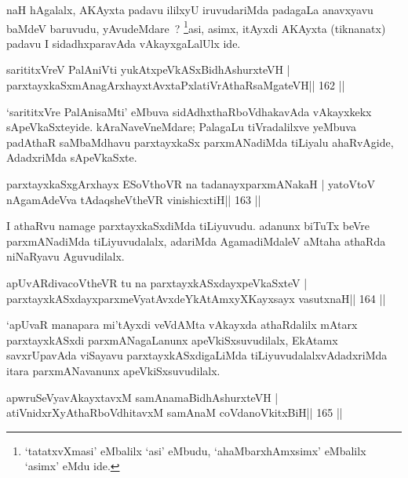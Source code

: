 \begin{artha}
naH hAgalalx, AKAyxta padavu ililxyU iruvudariMda padagaLa anavxyavu baMdeV baruvudu, yAvudeMdare~? \footnote[1]{`tatatxvXmasi' eMbalilx `asi' eMbudu, `ahaMbarxhAmxsimx' eMbalilx `asimx' eMdu ide.}asi, asimx, itAyxdi AKAyxta (tiknanatx) padavu I sidadhxparavAda vAkayxgaLalUlx ide.
\end{artha}


\begin{shl}
sarititxVreV PalAniVti yukAtx\s peVkASx\s BidhAshurxteVH |
parxtayxkaSxmAnagArxhayxtAvxtaPxlatiVrAthaRsaMgateVH\hfill || 162 ||
\end{shl}

\begin{artha}
`sarititxVre PalAnisaMti' eMbuva sidAdhxthaRboVdhakavAda vAkayxkekx sApeVkaSxteyide. kAraNaveVneMdare; PalagaLu tiVradalilxve yeMbuva padAthaR saMbaMdhavu parxtayxkaSx parxmANadiMda tiLiyalu ahaRvAgide, AdadxriMda sApeVkaSxte.
\end{artha}

\begin{shl}
parxtayxkaSxgArxhayx ESoV\s thoVR na tadanayxparxmANakaH |
yatoV\s toV nA\s\s gamAdeVva tAdaqsheV\s theVR vinishicxtiH\hfill || 163 ||
\end{shl}

\begin{artha}
I athaRvu namage parxtayxkaSxdiMda tiLiyuvudu. adanunx biTuTx beVre parxmANadiMda tiLiyuvudalalx, adariMda AgamadiMdaleV aMtaha athaRda niNaRyavu Aguvudilalx.
\end{artha}

\begin{shl}
apUvARdivacoV\s theVR tu na parxtayxkASxdayxpeVkaSxteV |
parxtayxkASxdayxparxmeVyatAvxdeYkAtAmxyXKayxsayx vasutxnaH\hfill || 164 ||
\end{shl}

\begin{artha}
`apUvaR manapara mi'tAyxdi veVdAMta vAkayxda athaRdalilx mAtarx parxtayxkASxdi parxmANagaLanunx apeVkiSxsuvudilalx, EkAtamx savxrUpavAda viSayavu parxtayxkASxdigaLiMda tiLiyuvudalalxvAdadxriMda itara parxmANavanunx apeVkiSxsuvudilalx.
\end{artha}

\begin{shl}
apwruSeVyavAkayxtavxM samAnamaBidhAshurxteVH |
atiVnidxrXyAthaRboVdhitavxM samAnaM coVdanoVkitxBiH\hfill || 165 ||
\end{shl}

